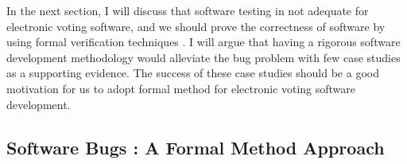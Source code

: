 %   
%   
%   
%   
%   
%   
%   
%  
%   
   In the next section, I will discuss that software testing 
   in not adequate for electronic voting software, and we should 
   prove the  correctness of software
   by using formal verification techniques \cite{BECKERT2014115}.
   I will argue that  having a rigorous software development methodology would alleviate 
	the bug problem with few case studies as a supporting evidence. The success of these 
	case studies should be a good motivation for us to 
	adopt formal method for electronic voting software development. 
   
   
   \subsection{Software Bugs : A Formal Method Approach}

